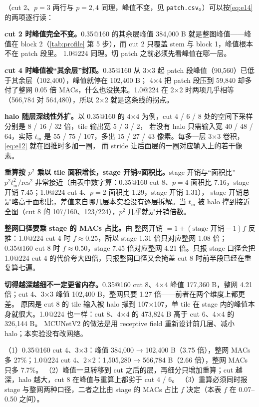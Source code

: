 \documentclass[11pt,a4paper]{ctexart}
\begin{document}
（cut 2、$p=3$ 两行与 $p=2,4$ 同理，峰值不变，见 \texttt{patch.csv}。）可以按\cref{eq:e14}的两项逐行读：

\textbf{cut 2 时峰值完全不变。}0.35@160 的其余层峰值 384,000 B 就是整图峰值——峰值在 block 2（\cref{tab:profile} 第 5 步），而 cut 2 只覆盖 stem 与 block 1，峰值根本不在 patch 段里。
1.0@224 同理。切 patch 之前必须先看峰值在哪一层。

\textbf{cut 4 时峰值被“其余层”封顶。}0.35@160 从 3×3 起 patch 段峰值（90,560）已低于其余层（102,400），峰值就停在 102,400 B；
4×4 把 patch 段压到 59,840 却多付了整网 0.05 倍 MACs，什么也没换来。1.0@224 在 2×2 时两项几乎相等（566,784 对 564,480），所以 2×2 就是这条线的拐点。

\textbf{halo 随层深线性外扩。}以 0.35@160 的 4×4 为例，cut 4 / 6 / 8 处的空间下采样分别是 8 / 16 / 32 倍，tile 输出宽 5 / 3 / 2，
若没有 halo 只需输入宽 40 / 48 / 64，实际 $t_\text{in}$ 是 55 / 75 / 107，多出 15 / 27 / 43 像素。每多一层 3×3 卷积，\cref{eq:e12} 就在回推时多加一圈，
而 stride 让后面层的一圈对应输入上的若干像素。

\textbf{重算按 $p^2$ 乘以 tile 面积增长，stage 开销≈面积比。}stage 开销与“面积比”$p^2 t_\text{in}^2/\text{res}^2$ 非常接近（由表中数字算：0.35@160 cut 8、$p=4$ 面积比 7.16，stage 开销 7.45；1.0@224 cut 4、$p=2$ 面积比 1.29，stage 开销 1.31），
stage 开销总是略高于面积比，差值来自哪几层本实验没有逐层拆解。当 $t_\text{in}$ 被 halo 撑到接近全图（cut 8 的 107/160、123/224），$p^2$ 几乎就是开销倍数。

\textbf{整网口径要乘 stage 的 MACs 占比。}由 整网开销 $= 1 + (\text{stage 开销}-1)f$ 反推：1.0@224 cut 4 时 $f\approx0.25$，所以 stage 1.31 倍只对应整网 1.08 倍；
0.35@160 cut 8 时 $f\approx0.50$，stage 7.45 倍对应整网 4.21 倍。只报 stage 口径会把 1.0@224 cut 4 的代价夸大四倍，只报整网口径又会掩盖 cut 8 时前半段已经在重复算七遍。

\textbf{切得越深越细不一定更省内存。}0.35@160 cut 8、4×4 峰值 177,360 B，整网 4.21 倍；cut 4、3×3 峰值 102,400 B，整网只要 1.27 倍——前者在两个维度上都更差。
原因是 cut 8 的 tile 输入被 halo 撑到 107×107，单 tile 在 stage 内的峰值本身就很大。1.0@224 也一样：cut 8、4×4 的 473,824 B 高于 cut 6、4×4 的 326,144 B。
MCUNetV2 的做法是用 receptive field 重新设计前几层、减小 halo；本实验没有改网络。

\begin{findingbox}[：patch 推理]
（1）0.35@160 cut 4、3×3：峰值 384,000 → 102,400 B（3.75 倍），整网 MACs 多 27\%；1.0@224 cut 4、2×2：1,505,280 → 566,784 B（2.66 倍），整网 MACs 只多 7.7\%。
（2）峰值一旦转移到 cut 之后的层，再细分只增加重算；cut 越深，halo 越大，cut 8 在峰值与重算上都劣于 cut 4 / 6。
（3）重算必须同时报 stage 与整网两种口径，二者之比由 stage 的 MACs 占比 $f$ 决定（本表 $f$ 在 0.07--0.50 之间）。
\end{findingbox}
\end{document}

